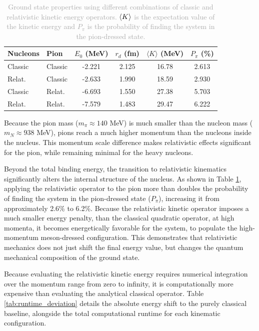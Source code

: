 \documentclass[a4paper,oneside,article,12pt]{memoir}
\begin{document}
\begin{table}[htbp]
    \centering
    \renewcommand{\arraystretch}{1.2}
    \begin{tabular}{ll cccc}
        \hline
        \textbf{Nucleons} & \textbf{Pion} & \textbf{$E_0$ (MeV)} & \textbf{$r_d$ (fm)} & \textbf{$\langle K \rangle$ (MeV)} & \textbf{$P_\pi$ (\%)} \\
        \hline
        Classic & Classic & -2.221 & 2.125 & 16.78 & 2.613 \\
        Relat.  & Classic & -2.633 & 1.990 & 18.59 & 2.930 \\
        Classic & Relat.  & -6.693 & 1.550 & 27.38 & 5.703 \\
        Relat.  & Relat.  & -7.579 & 1.483 & 29.47 & 6.222 \\
        \hline
    \end{tabular}
    \caption{\textcolor{darkgray}{Ground state properties using different combinations of classic and relativistic kinetic energy operators. $\br[3]{K}$ is the expectation value of the kinetic energy and $P_π$ is the probability of finding the system in the pion-dressed state.}}
    \label{tab:kinematics}
\end{table}


Because the pion mass ($m_π \approx 140$ MeV) is much smaller than the nucleon mass ($m_N \approx 938$ MeV), pions reach a much higher momentum than the nucleons inside the nucleus. This momentum scale difference makes relativistic effects significant for the pion, while remaining minimal for the heavy nucleons. 

\newpage
Beyond the total binding energy, the transition to relativistic kinematics significantly alters the internal structure of the nucleus. As shown in Table \ref{tab:kinematics}, applying the relativistic operator to the pion more than doubles the probability of finding the system in the pion-dressed state ($P_\pi$), increasing it from approximately 2.6\% to 6.2\%. 
Because the relativistic kinetic operator imposes a much smaller energy penalty, than the classical quadratic operator, at high momenta, it becomes energetically favorable for the system, to populate the high-momentum meson-dressed configuration. This demonstrates that relativistic mechanics does not just shift the final energy value, but changes the quantum mechanical composition of the ground state.

Because evaluating the relativistic kinetic energy requires numerical integration over the momentum range from zero to infinity, it is computationally more expensive than evaluating the analytical classical operator. Table \ref{tab:runtime_deviation} details the absolute energy shift to the purely classical baseline, alongside the total computational runtime for each kinematic configuration. 
\end{document}
